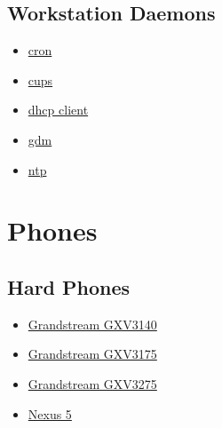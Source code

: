 \subsection{Workstation Daemons}
\begin{itemize}
\item \href{http://ftp.isc.org/isc/cron/}{cron}
\item \href{http://www.cups.org/}{cups}
\item \href{http://www.isc.org/}{dhcp client}
\item \href{https://wiki.gnome.org/Projects/GDM}{gdm}
\item \href{http://support.ntp.org/}{ntp}
\end{itemize}

\section{Phones}
\subsection{Hard Phones}
\begin{itemize}
\item \href{https://www.grandstream.com/products/ip-video-telephony/gxv3140/}{Grandstream GXV3140}
\item \href{https://www.grandstream.com/products/ip-video-telephony/gxv3175/}{Grandstream GXV3175}
\item \href{https://www.grandstream.com/products/ip-video-telephony/gxv3275/}{Grandstream GXV3275}
\item \href{http://www.google.com/nexus/5/}{Nexus 5}
\end{itemize}

